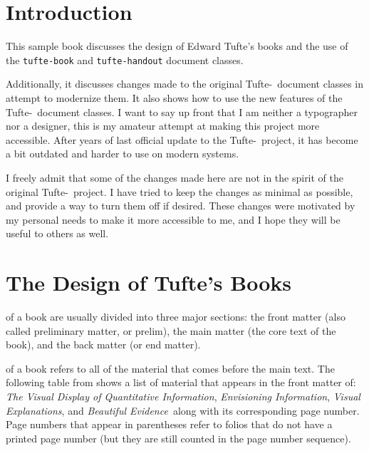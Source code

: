 \documentclass[a4paper]{tufte-book}
\newcommand{\VDQI}{\textit{The Visual Display of Quantitative Information}\xspace}
\newcommand{\EI}{\textit{Envisioning Information}\xspace}
\newcommand{\VE}{\textit{Visual Explanations}\xspace}
\newcommand{\BE}{\textit{Beautiful Evidence}\xspace}
\newcommand{\TL}{Tufte-\hologo{LaTeX}\xspace}
\newcommand{\doccls}[1]{\texttt{#1}}
\begin{document}
\vfill
\vfill


\cleardoublepage{}
\chapter*{Introduction}
\thispagestyle{fancy}
This sample book discusses the design of Edward Tufte's books%
\cite{Tufte2001,Tufte1990,Tufte1997,Tufte2006}
and the use of the \doccls{tufte-book} and \doccls{tufte-handout} document classes.

Additionally, it discusses changes made to the original \TL\ document classes in attempt to modernize them.
It also shows how to use the new features of the \TL\ document classes.
I want to say up front that I am neither a typographer nor a designer, this is my amateur attempt at making this project more accessible.
After years of last official update to the \TL\ project, it has become a bit outdated and harder to use on modern systems.

I freely admit that some of the changes made here are not in the spirit of the original \TL\ project.
I have tried to keep the changes as minimal as possible, and provide a way to turn them off if desired.
These changes were motivated by my personal needs to make it more accessible to me, and I hope they will be useful to others as well.


\mainmatter{}


\chapter{The Design of Tufte's Books}\label{ch:tufte-design}
 of a book are usually divided into three major sections:
the front matter (also called preliminary matter, or prelim),
the main matter (the core text of the book),
and the back matter (or end matter).

 of a book refers to all of the material that comes before the main text.
The following table from shows a list of material that appears in the front matter of: \VDQI, \EI, \VE, and \BE\ along with its corresponding page number.
Page numbers that appear in parentheses refer to folios that do not have a printed page number (but they are still counted in the page number sequence).
\end{document}
